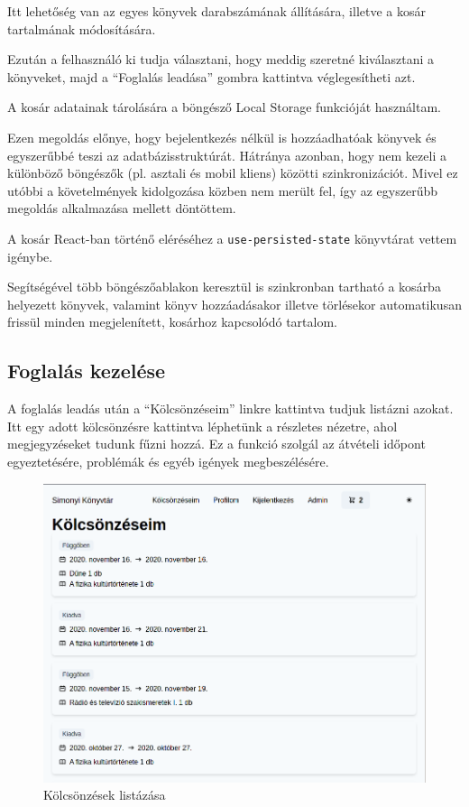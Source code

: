 Itt lehetőség van az egyes könyvek darabszámának állítására, illetve a kosár tartalmának módosítására.

Ezután a felhasználó ki tudja választani, hogy meddig szeretné kiválasztani a könyveket, majd a ``Foglalás leadása'' gombra kattintva
véglegesítheti azt.

A kosár adatainak tárolására a böngésző Local Storage funkcióját használtam.

Ezen megoldás előnye, hogy bejelentkezés nélkül is hozzáadhatóak könyvek és egyszerűbbé teszi az adatbázisstruktúrát.
Hátránya azonban, hogy nem kezeli a különböző böngészők (pl. asztali és mobil kliens) közötti szinkronizációt. Mivel ez utóbbi a
követelmények kidolgozása közben nem merült fel, így az egyszerűbb megoldás alkalmazása mellett döntöttem.

A kosár React-ban történő eléréséhez a \lstinline|use-persisted-state| könyvtárat vettem igénybe.

Segítségével több böngészőablakon keresztül is szinkronban tartható a kosárba helyezett könyvek,
valamint könyv hozzáadásakor illetve törlésekor automatikusan frissül minden megjelenített, kosárhoz kapcsolódó tartalom.

\subsection{Foglalás kezelése}

A foglalás leadás után a ``Kölcsönzéseim'' linkre kattintva tudjuk listázni azokat. Itt egy adott kölcsönzésre kattintva
léphetünk a részletes nézetre, ahol megjegyzéseket tudunk fűzni hozzá. Ez a funkció szolgál az átvételi időpont egyeztetésére,
problémák és egyéb igények megbeszélésére.

\begin{figure}[!ht]
  \centering
  \includegraphics[width=150mm, keepaspectratio]{figures/orders-list.png}
  \caption{Kölcsönzések listázása}
  \label{fig:OrderList}
\end{figure}


